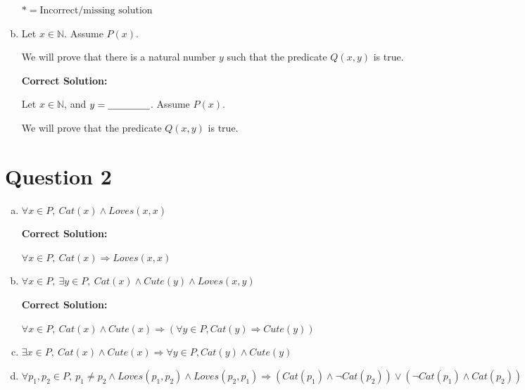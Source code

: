 \documentclass[12pt]{article}
\begin{document}
\begin{enumerate}[a.]
    $* = \text{Incorrect/missing solution}$

    \item

    Let $x \in \mathbb{N}$. Assume $P(x)$.

    \bigskip

    We will prove that there is a natural number $y$ such that the predicate
    $Q(x,y)$ is true.

    \bigskip

    \textbf{Correct Solution:}

    Let $x \in \mathbb{N}$, and $y = \underline{\hspace{1.5cm}}$. Assume $P(x)$.

    \bigskip

    We will prove that the predicate $Q(x,y)$ is true.

\end{enumerate}

\section*{Question 2}
\begin{enumerate}[a.]
    \item

    $\forall x \in P,\:Cat(x) \land Loves(x,x)$

    \bigskip

    \textbf{Correct Solution:}

    $\forall x \in P,\:Cat(x) \Rightarrow Loves(x,x)$

    \item

    $\forall x \in P,\: \exists y \in P,\: Cat(x) \land Cute(y) \land Loves(x,y)$

    \bigskip

    \textbf{Correct Solution:}

    $\forall x \in P,\: Cat(x) \land Cute(x) \Rightarrow (\forall y \in P, Cat(y)
    \Rightarrow Cute(y))$

    \item

    $\exists x \in P,\: Cat(x) \land Cute(x) \Rightarrow \forall y \in P, Cat(y)
    \land Cute(y)$

    \item

    $\forall p_1,p_2 \in P,\:p_1 \neq p_2 \land Loves(p_1,p_2) \land Loves(p_2,p_1)
    \Rightarrow (Cat(p_1) \land \neg Cat(p_2)) \lor (\neg Cat(p_1) \land Cat(p_2))$

\end{enumerate}
\end{document}
